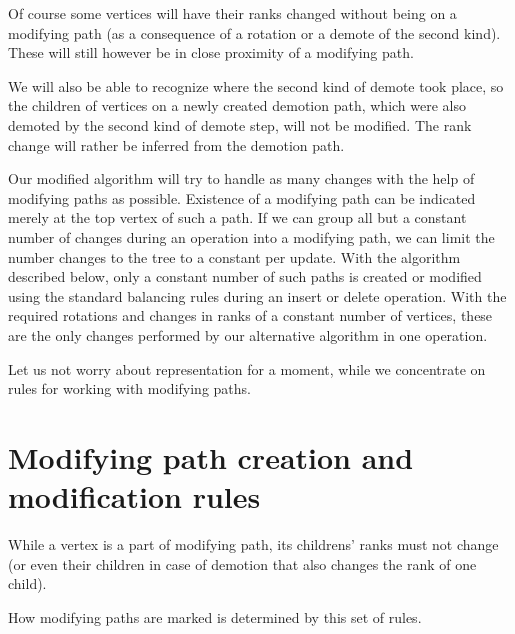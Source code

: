 Of course some vertices will have their ranks changed without being on a modifying path (as a consequence of a rotation or a demote of the second kind). 
These will still however be in close proximity of a modifying path.

We will also be able to recognize where the second kind of demote took place, so the children of vertices on a newly created demotion path, which were also demoted by the second kind of demote step, will not be modified. 
The rank change will rather be inferred from the demotion path. 

Our modified algorithm will try to handle as many changes with the help of modifying paths as possible. 
Existence of a modifying path can be indicated merely at the top vertex of such a path. 
If we can group all but a constant number of changes during an operation into a modifying path, we can limit the number changes to the tree to a constant per update. 
With the algorithm described below, only a constant number of such paths is created or modified using the standard balancing rules during an insert or delete operation. 
With the required rotations and changes in ranks of a constant number of vertices, these are the only changes performed by our alternative algorithm in one operation.

Let us not worry about representation for a moment, while we concentrate on rules for working with modifying paths.

\section{Modifying path creation and modification rules}

While a vertex is a part of modifying path, its childrens' ranks must not change (or even their children in case of demotion that also changes the rank of one child). 

How modifying paths are marked is determined by this set of rules.

